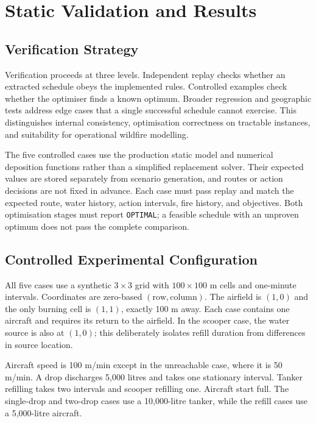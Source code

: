\chapter{Static Validation and Results}
\label{ch:static-validation}

\section{Verification Strategy}
\label{sec:validation-strategy}

Verification proceeds at three levels. Independent replay checks whether an extracted schedule obeys the implemented rules. Controlled examples check whether the optimiser finds a known optimum. Broader regression and geographic tests address edge cases that a single successful schedule cannot exercise. This distinguishes internal consistency, optimisation correctness on tractable instances, and suitability for operational wildfire modelling.

The five controlled cases use the production static model and numerical deposition functions rather than a simplified replacement solver. Their expected values are stored separately from scenario generation, and routes or action decisions are not fixed in advance. Each case must pass replay and match the expected route, water history, action intervals, fire history, and objectives. Both optimisation stages must report \texttt{OPTIMAL}; a feasible schedule with an unproven optimum does not pass the complete comparison.

\section{Controlled Experimental Configuration}
\label{sec:validation-configuration}

All five cases use a synthetic $3\times3$ grid with $100\times100$ m cells and one-minute intervals. Coordinates are zero-based $(\mathrm{row},\mathrm{column})$. The airfield is $(1,0)$ and the only burning cell is $(1,1)$, exactly 100 m away. Each case contains one aircraft and requires its return to the airfield. In the scooper case, the water source is also at $(1,0)$; this deliberately isolates refill duration from differences in source location.

Aircraft speed is 100 m/min except in the unreachable case, where it is 50 m/min. A drop discharges 5,000 litres and takes one stationary interval. Tanker refilling takes two intervals and scooper refilling one. Aircraft start full. The single-drop and two-drop cases use a 10,000-litre tanker, while the refill cases use a 5,000-litre aircraft.

